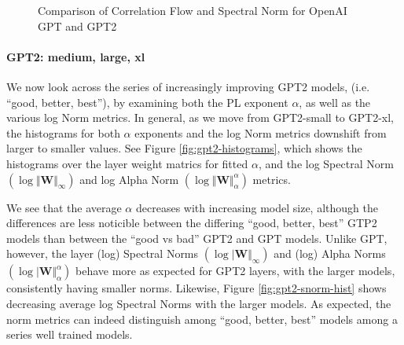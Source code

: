 \begin{figure}[htb]
    \centering
    \caption{Comparison of Correlation Flow and Spectral Norm for OpenAI GPT and GPT2   }
    \label{fig:gpt-alpha-layers}
\end{figure}


\paragraph{GPT2: medium, large, xl} 
We now look across the series of increasingly improving GPT2 models, (i.e. ``good, better, best''), 
by examining both the PL exponent $\alpha$, as well as the various log Norm metrics.  
In general, as we move from GPT2-small to GPT2-xl, 
the histograms for both $\alpha$ exponents and the log Norm metrics downshift from larger to smaller values. 
See Figure \ref{fig:gpt2-histograms}, which shows the histograms over the layer weight matrics
for fitted $\alpha$, and the log Spectral Norm
 $(\log\Vert\mathbf{W}\Vert_{\infty})$  
and log Alpha Norm
 $(\log\Vert\mathbf{W}\Vert_{\alpha}^{\alpha})$ 
metrics.

We see that the average $\alpha$ decreases with increasing model size, although the differences are less noticible 
between the differing ``good, better, best'' GTP2 models than between the ``good vs bad'' GPT2 and GPT models.
Unlike GPT, however, the layer (log) Spectral Norms $(\log\vert\mathbf{W}\Vert_{\infty})$ 
and (log) Alpha Norms $(\log\vert\mathbf{W}\Vert_{\alpha}^{\alpha})$
behave more as expected for GPT2 layers, with the larger models, consistently having smaller norms. 
Likewise, Figure \ref{fig:gpt2-snorm-hist} shows decreasing average log Spectral Norms with the larger models.  
As expected, the norm metrics can indeed distinguish among ``good, better, best'' models
among a series well trained models.

